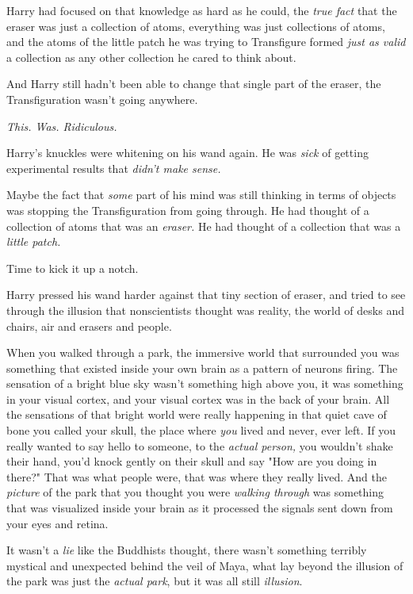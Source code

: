 Harry had focused on that knowledge as hard as he could, the \emph{true fact}
that the eraser was just a collection of atoms, everything was just collections
of atoms, and the atoms of the little patch he was trying to Transfigure formed
\emph{just as valid} a collection as any other collection he cared to think
about.

And Harry still hadn't been able to change that single part of the eraser, the
Transfiguration wasn't going anywhere.

\emph{This. Was. Ridiculous.}

Harry's knuckles were whitening on his wand again. He was \emph{sick} of
getting experimental results that \emph{didn't make sense.}

Maybe the fact that \emph{some} part of his mind was still thinking in terms of
objects was stopping the Transfiguration from going through. He had thought of
a collection of atoms that was an \emph{eraser.} He had thought of a collection
that was a \emph{little patch.}

Time to kick it up a notch.

Harry pressed his wand harder against that tiny section of eraser, and tried to
see through the illusion that nonscientists thought was reality, the world of
desks and chairs, air and erasers and people.

When you walked through a park, the immersive world that surrounded you was
something that existed inside your own brain as a pattern of neurons firing.
The sensation of a bright blue sky wasn't something high above you, it was
something in your visual cortex, and your visual cortex was in the back of your
brain. All the sensations of that bright world were really happening in that
quiet cave of bone you called your skull, the place where \emph{you} lived and
never, ever left. If you really wanted to say hello to someone, to the
\emph{actual person,} you wouldn't shake their hand, you'd knock gently on
their skull and say "How are you doing in there?" That was what people were,
that was where they really lived. And the \emph{picture} of the park that you
thought you were \emph{walking through} was something that was visualized
inside your brain as it processed the signals sent down from your eyes and
retina.

It wasn't a \emph{lie} like the Buddhists thought, there wasn't something
terribly mystical and unexpected behind the veil of Maya, what lay beyond the
illusion of the park was just the \emph{actual park}, but it was all still
\emph{illusion}.


